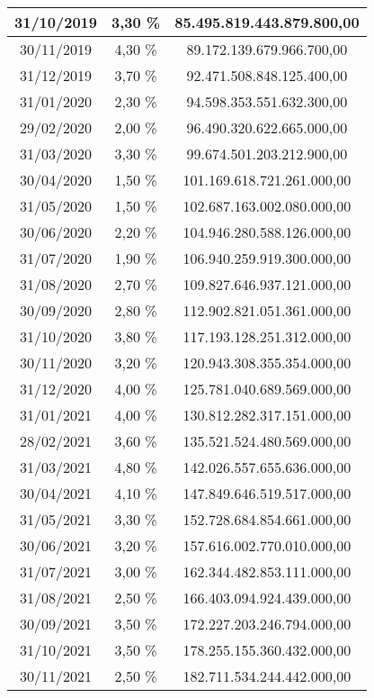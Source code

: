 \begin{center}
\begin{longtable}{|c|c|c|}
31/10/2019 & 3,30 \% & 85.495.819.443.879.800,00  \\ \hline
30/11/2019 & 4,30 \% & 89.172.139.679.966.700,00  \\ \hline
31/12/2019 & 3,70 \% & 92.471.508.848.125.400,00  \\ \hline
31/01/2020 & 2,30 \% & 94.598.353.551.632.300,00  \\ \hline
29/02/2020 & 2,00 \% & 96.490.320.622.665.000,00  \\ \hline
31/03/2020 & 3,30 \% & 99.674.501.203.212.900,00  \\ \hline
30/04/2020 & 1,50 \% & 101.169.618.721.261.000,00  \\ \hline
31/05/2020 & 1,50 \% & 102.687.163.002.080.000,00  \\ \hline
30/06/2020 & 2,20 \% & 104.946.280.588.126.000,00  \\ \hline
31/07/2020 & 1,90 \% & 106.940.259.919.300.000,00  \\ \hline
31/08/2020 & 2,70 \% & 109.827.646.937.121.000,00  \\ \hline
30/09/2020 & 2,80 \% & 112.902.821.051.361.000,00  \\ \hline
31/10/2020 & 3,80 \% & 117.193.128.251.312.000,00  \\ \hline
30/11/2020 & 3,20 \% & 120.943.308.355.354.000,00  \\ \hline
31/12/2020 & 4,00 \% & 125.781.040.689.569.000,00  \\ \hline
31/01/2021 & 4,00 \% & 130.812.282.317.151.000,00 \\ \hline
28/02/2021 & 3,60 \% & 135.521.524.480.569.000,00 \\ \hline
31/03/2021 & 4,80 \% & 142.026.557.655.636.000,00 \\ \hline
30/04/2021 & 4,10 \% & 147.849.646.519.517.000,00 \\ \hline
31/05/2021 & 3,30 \% & 152.728.684.854.661.000,00 \\ \hline
30/06/2021 & 3,20 \% & 157.616.002.770.010.000,00 \\ \hline
31/07/2021 & 3,00 \% & 162.344.482.853.111.000,00 \\ \hline
31/08/2021 & 2,50 \% & 166.403.094.924.439.000,00 \\ \hline
30/09/2021 & 3,50 \% & 172.227.203.246.794.000,00 \\ \hline
31/10/2021 & 3,50 \% & 178.255.155.360.432.000,00 \\ \hline
30/11/2021 & 2,50 \% & 182.711.534.244.442.000,00 \\ \hline
\end{longtable}
\end{center}